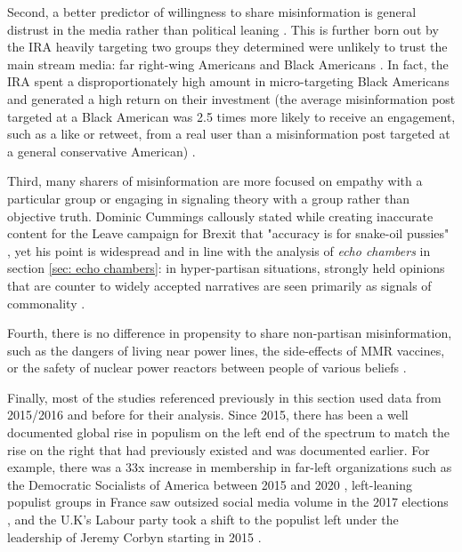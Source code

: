 \documentclass[preprint,review,12pt]{elsarticle}
\begin{document}
Second, a better predictor of willingness to share misinformation is general distrust in the media rather than political leaning \cite{hopp2020people,shin2017partisan,kahan2012ideology,lewandowsky2016motivated,swire2017processing,mourao2019fake}. This is further born out by the IRA heavily targeting two groups they determined were unlikely to trust the main stream media: far right-wing Americans and Black Americans \cite{diresta2019tactics,howard2019ira,boatwright2018troll,jamieson2020cyberwar,mueller2019mueller,freelon2020black}. In fact, the IRA spent a disproportionately high amount in micro-targeting Black Americans and generated a high return on their investment (the average misinformation post targeted at a Black American was 2.5 times more likely to receive an engagement, such as a like or retweet, from a real user than a misinformation post targeted at a general conservative American) \cite{howard2019ira,freelon2020black}.

Third, many sharers of misinformation are more focused on empathy with a particular group \cite{winter2015they,rheault2016measuring,dale2017nlp} or engaging in signaling theory with a group \cite{connelly2011signaling,lampe2007familiar,spence2002signaling} rather than objective truth. Dominic Cummings callously stated while creating inaccurate content for the Leave campaign for Brexit that "accuracy is for snake-oil pussies" \cite{crace2016accuracy}, yet his point is widespread and in line with the analysis of \textit{echo chambers} in section \ref{sec: echo chambers}: in hyper-partisan situations, strongly held opinions that are counter to widely accepted narratives are seen primarily as signals of commonality \cite{yla2018populist,noppari2019user,lazer2018science,yla2019politicization,wasilewski2019us,freelon2020russian}. 


Fourth, there is no difference in propensity to share non-partisan misinformation, such as the dangers of living near power lines, the side-effects of MMR vaccines, or the safety of nuclear power reactors between people of various beliefs \cite{kahan2015climate,hara2016co,kahan2012ideology,lewandowsky2016motivated,barbera2015tweeting}.

Finally, most of the studies referenced previously in this section used data from 2015/2016 and before for their analysis. Since 2015, there has been a well documented global rise in populism on the left end of the spectrum to match the rise on the right that had previously existed and was documented earlier. For example, there was a 33x increase in membership in far-left organizations such as the Democratic Socialists of America between 2015 and 2020 \cite{godfrey2020thousands}, left-leaning populist groups in France saw outsized social media volume in the 2017 elections \cite{donadio2017french}, and the U.K's Labour party took a shift to the populist left under the leadership of Jeremy Corbyn starting in 2015 \cite{wainwright2018remarkable,hobson_fielding_2019}. 
\end{document}
